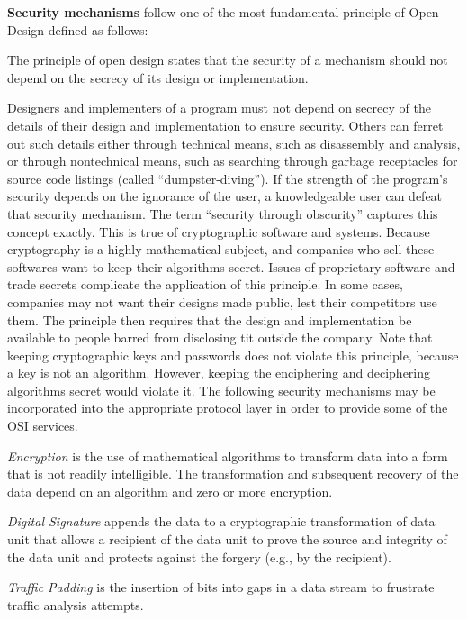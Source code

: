 	\textbf{Security mechanisms} follow one of the most fundamental principle of Open Design \cite{bishop2004introduction} defined as follows:
		\begin{definition}
			The principle of open design states that the security of a mechanism should not depend on the secrecy of its design or implementation.
			\label{def:open-design}
		\end{definition}
		Designers and implementers of a program must not depend on secrecy of the details of their design and implementation to ensure security.
		Others can ferret out such details either through technical means, such as disassembly and analysis, or through nontechnical means, such as searching through garbage receptacles for source code listings (called ``dumpster-diving'').
		If the strength of the program's security depends on the ignorance of the user, a knowledgeable user can defeat that security mechanism.
		The term ``security through obscurity'' captures this concept exactly.
		This is true of cryptographic software and systems.
		Because cryptography is a highly mathematical subject, and companies who sell these softwares want to keep their algorithms secret. 
		Issues of proprietary software and trade secrets complicate the application of this principle.
		In some cases, companies may not want their designs made public, lest their competitors use them.
		The principle then requires that the design and implementation be available to people barred from disclosing tit outside the company.
		Note that keeping cryptographic keys and passwords does not violate this principle, because a key is not an algorithm.
		However, keeping the enciphering and deciphering algorithms secret would violate it.
		The following security mechanisms may be incorporated into the appropriate protocol layer in order to provide some of the OSI services.

		\textit{Encryption} is the use of mathematical algorithms to transform data into a form that is not readily intelligible.
		The transformation and subsequent recovery of the data depend on an algorithm and zero or more encryption.

		\textit{Digital Signature} appends the data to a cryptographic transformation of data unit that allows a recipient of the data unit to prove the source and integrity of the data unit and protects against the forgery (e.g., by the recipient).

		\textit{Traffic Padding} is the insertion of bits into gaps in a data stream to frustrate traffic analysis attempts.

